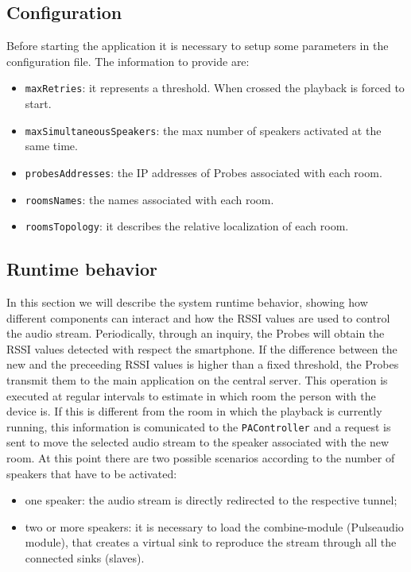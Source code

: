 \documentclass[conference]{./IEEEtran}
\begin{document}
\subsection{Configuration}
Before starting the application it is necessary to setup some parameters in the configuration file. The information to provide are:
\begin{itemize}
\item \texttt{maxRetries}: it represents a threshold. When crossed the playback is forced to start. 
\item \texttt{maxSimultaneousSpeakers}: the max number of speakers activated at the same time.
\item \texttt{probesAddresses}: the IP addresses of Probes associated with each room.
\item \texttt{roomsNames}: the names associated with each room.
\item \texttt{roomsTopology}: it describes the relative localization of each room. %
\end{itemize}

\subsection{Runtime behavior}
In this section we will describe the system runtime behavior, showing how different components can interact and how the RSSI values are used to control the audio stream.
Periodically, through an inquiry, the Probes will obtain the RSSI values detected with respect the smartphone. If the difference between the new and the preceeding RSSI values is higher than a fixed threshold, the Probes transmit them to the main application on the central server. This operation is executed at regular intervals to estimate in which room the person with the device is. If this is different from the room in which the playback is currently running, this information is comunicated to the \texttt{PAController} and a request is sent to move the selected audio stream to the speaker associated with the new room. At this point there are two possible scenarios according to the number of speakers that have to be activated:
\begin{itemize}
\item one speaker: the audio stream is directly redirected to the respective tunnel;
\item two or more speakers: it is necessary to load the combine-module (Pulseaudio module), that creates a virtual sink to reproduce the stream through all the connected sinks (slaves). 
\end{itemize}  
\end{document}
